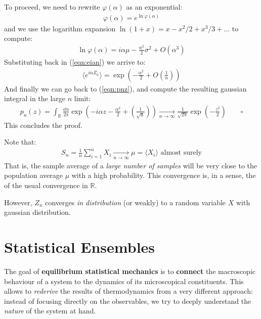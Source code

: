 \documentclass[../template.tex]{subfiles}
\begin{document}
To proceed, we need to rewrite $\varphi(\alpha)$ as an exponential:
\begin{align*}
    \varphi(\alpha) = e^{\ln \varphi(\alpha)}
\end{align*}
and we use the logarithm expansion $\ln (1+x) = x- x^2/2 + x^3/3 + \dots $ to compute:
\begin{align*}
    \ln \varphi(\alpha) = i \alpha \mu - \frac{\alpha^2}{2} \sigma^2 + O(\alpha^3) 
\end{align*}
Substituting back in (\ref{eqn:eian}) we arrive to:
\begin{align*}
    \langle e^{i \alpha Z_n} \rangle = \exp\left(-\frac{\alpha^2}{2} + O\left(\frac{1}{n} \right) \right)
\end{align*}
And finally we can go back to (\ref{eqn:pnz}), and compute the resulting gaussian integral in the large $n$ limit:
\begin{align*}
    p_n(z) = \int_{\mathbb{R}} \frac{\dd{\alpha}}{2 \pi} \exp\left(-i \alpha z - \frac{\alpha^2}{2} + \operatorname{\left(\frac{1}{\sqrt{n}} \right)}  \right)  \xrightarrow[n \to \infty]{} \frac{1}{\sqrt{2 \pi}} \exp\left(-\frac{z^2}{2}  \right) \qquad \square
\end{align*}
This concludes the proof.

\medskip

Note that:
\begin{align*}
    S_n = \frac{1}{n} \sum_{i=1}^n X_i  \xrightarrow[n \to \infty]{}   \mu = \langle X_i \rangle \text{ almost surely}
\end{align*}
That is, the sample average of a \textit{large number of samples} will be very close to the population average $\mu$ with a high probability. This convergence is, in a sense, the  of the usual convergence in $\mathbb{R}$.

\medskip

However, $Z_n$ converges \textit{in distribution} (or weakly) to a random variable $X$ with gaussian distribution. %


\chapter{Statistical Ensembles}

The goal of \textbf{equilibrium statistical mechanics} is to \textbf{connect} the macroscopic behaviour of a system to the dynamics of its microscopical constituents. This allows to \textit{rederive} the results of thermodynamics from a very different approach: instead of focusing directly on the observables, we try to deeply understand the \textit{nature} of the system at hand.
\end{document}
